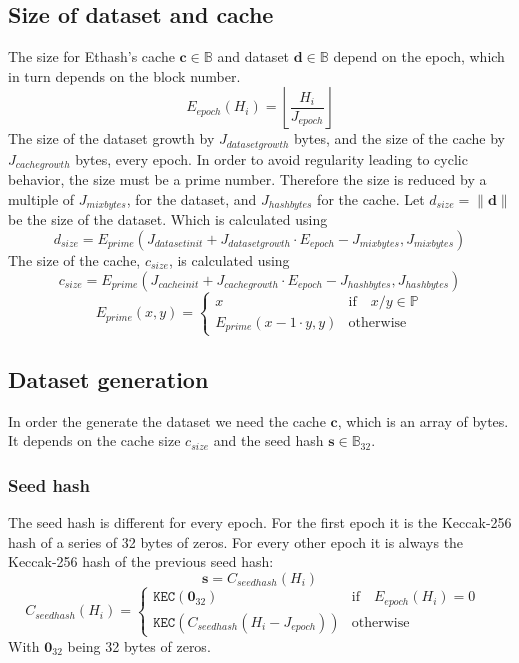 \documentclass[9pt,oneside]{amsart}
\begin{document}
\subsection{Size of dataset and cache}
The size for Ethash's cache $\mathbf{c} \in \mathbb{B}$  and dataset $\mathbf{d} \in \mathbb{B}$ depend on the epoch, which in turn depends on the block number.
\begin{equation}
 E_{epoch}(H_i) = \left\lfloor\frac{H_i}{J_{epoch}}\right\rfloor
\end{equation}
The size of the dataset growth by $J_{datasetgrowth}$ bytes, and the size of the cache by $J_{cachegrowth}$ bytes, every epoch. In order to avoid regularity leading to cyclic behavior, the size must be a prime number. Therefore the size is reduced by a multiple of $J_{mixbytes}$, for the dataset, and $J_{hashbytes}$ for the cache. 
Let $d_{size} = \lVert \mathbf{d} \rVert$ be the size of the dataset. Which is calculated using
\begin{equation}
 d_{size} = E_{prime}(J_{datasetinit} + J_{datasetgrowth} \cdot E_{epoch} - J_{mixbytes}, J_{mixbytes})
\end{equation}
The size of the cache, $c_{size}$, is calculated using
\begin{equation}
 c_{size} = E_{prime}(J_{cacheinit} + J_{cachegrowth} \cdot E_{epoch} - J_{hashbytes}, J_{hashbytes})
\end{equation}
\begin{equation}
 E_{prime}(x, y) = \begin{cases}
x & \text{if} \quad x / y \in \mathbb{P} \\
E_{prime}(x - 1 \cdot y, y) & \text{otherwise}
\end{cases}
\end{equation}
\subsection{Dataset generation}
In order the generate the dataset we need the cache $\mathbf{c}$, which is an array of bytes. It depends on the cache size  $c_{size}$ and the seed hash $\mathbf{s} \in \mathbb{B}_{32}$. 
\subsubsection{Seed hash}
The seed hash is different for every epoch. For the first epoch it is the Keccak-256 hash of a series of 32 bytes of zeros. For every other epoch it is always the Keccak-256 hash of the previous seed hash:
\begin{equation}
 \mathbf{s} = C_{seedhash}(H_i)
\end{equation}
\begin{equation}
 C_{seedhash}(H_i) = \begin{cases}
\texttt{KEC}(\mathbf{0}_{32}) & \text{if} \quad E_{epoch}(H_i) = 0 \quad  \\
\texttt{KEC}(C_{seedhash}(H_i - J_{epoch})) & \text{otherwise}
\end{cases}
\end{equation}
With $\mathbf{0}_{32}$ being 32 bytes of zeros.
\end{document}
